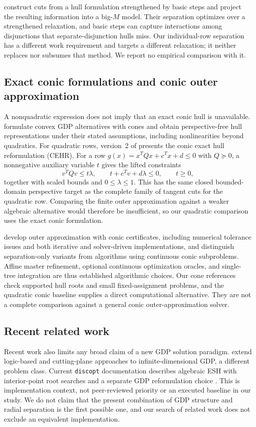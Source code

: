 \citet{trespalacios2016} construct cuts from a hull formulation strengthened by basic steps and project the resulting information into a big-$M$ model. Their separation optimizes over a strengthened relaxation, and basic steps can capture interactions among disjunctions that separate-disjunction hulls miss. Our individual-row separation has a different work requirement and targets a different relaxation; it neither replaces nor subsumes that method. We report no empirical comparison with it.

\subsection{Exact conic formulations and conic outer approximation}
A nonquadratic expression does not imply that an exact conic hull is unavailable. \citet{bernal2024} formulate convex GDP alternatives with cones and obtain perspective-free hull representations under their stated assumptions, including nonlinearities beyond quadratics. For quadratic rows, version~2 of \citet{gusev2026} presents the conic exact hull reformulation (CEHR). For a row $g(x)=x^TQx+c^Tx+d\leq0$ with $Q\succeq0$, a nonnegative auxiliary variable $t$ gives the lifted constraints
\begin{equation}\label{eq:related-cehr}
 v^TQv\leq t\lambda,\qquad
 t+c^Tv+d\lambda\leq0,\qquad t\geq0,
\end{equation}
together with scaled bounds and $0\leq\lambda\leq1$. This has the same closed bounded-domain perspective target as the complete family of tangent cuts for the quadratic row. Comparing the finite outer approximation against a weaker algebraic alternative would therefore be insufficient, so our quadratic comparison uses the exact conic formulation.

\citet{coey2020} develop outer approximation with conic certificates, including numerical tolerance issues and both iterative and solver-driven implementations, and distinguish separation-only variants from algorithms using continuous conic subproblems. Affine master refinement, optional continuous optimization oracles, and single-tree integration are thus established algorithmic choices. Our cone references check supported hull roots and small fixed-assignment problems, and the quadratic conic baseline supplies a direct computational alternative. They are not a complete comparison against a general conic outer-approximation solver.

\subsection{Recent related work}
Recent work also limits any broad claim of a new GDP solution paradigm. \citet{nguyen2026} extend logic-based and cutting-plane approaches to infinite-dimensional GDP, a different problem class. Current \texttt{discopt} documentation describes algebraic ESH with interior-point root searches and a separate GDP reformulation choice \citep{discopt2026}. This is implementation context, not peer-reviewed priority or an executed baseline in our study. We do not claim that the present combination of GDP structure and radial separation is the first possible one, and our search of related work does not exclude an equivalent implementation.
